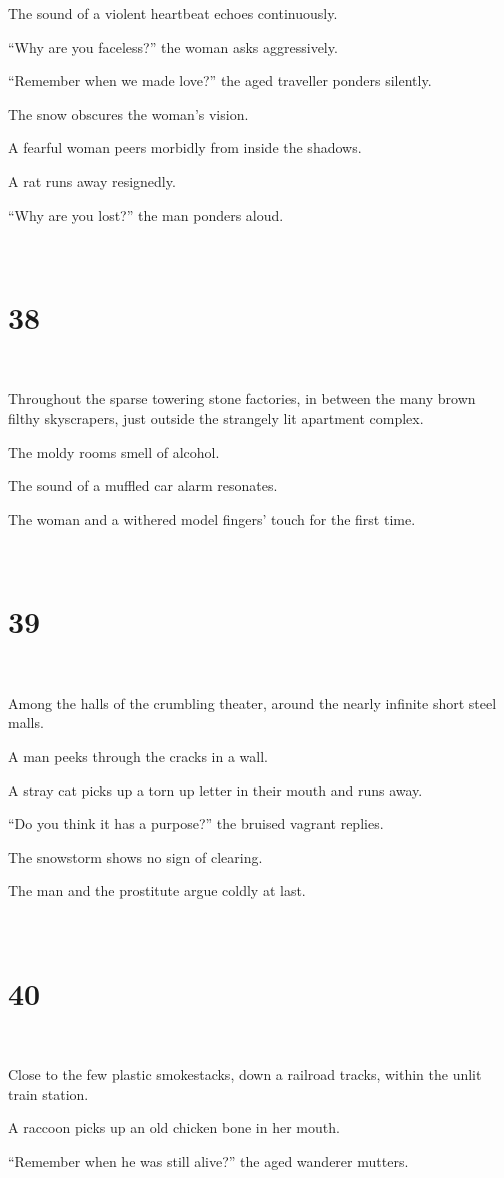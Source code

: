 \documentclass{report}
\begin{document}
The sound of a violent heartbeat echoes continuously.

``Why are you faceless?'' the woman asks aggressively.

``Remember when we made love?'' the aged traveller ponders silently.

The snow obscures the woman's vision.

A fearful woman peers morbidly from inside the shadows.

A rat runs away resignedly.

``Why are you lost?'' the man ponders aloud.

~
\chapter*{38}
~

Throughout the sparse towering stone factories, in between the many brown filthy skyscrapers, just outside the strangely lit apartment complex.

The moldy rooms smell of alcohol.

The sound of a muffled car alarm resonates.

The woman and a withered model fingers' touch for the first time.

~
\chapter*{39}
~

Among the halls of the crumbling theater, around the nearly infinite short steel malls.

A man peeks through the cracks in a wall.

A stray cat picks up a torn up letter in their mouth and runs away.

``Do you think it has a purpose?'' the bruised vagrant replies.

The snowstorm shows no sign of clearing.

The man and the prostitute argue coldly at last.

~
\chapter*{40}
~

Close to the few plastic smokestacks, down a railroad tracks, within the unlit train station.

A raccoon picks up an old chicken bone in her mouth.

``Remember when he was still alive?'' the aged wanderer mutters.
\end{document}
